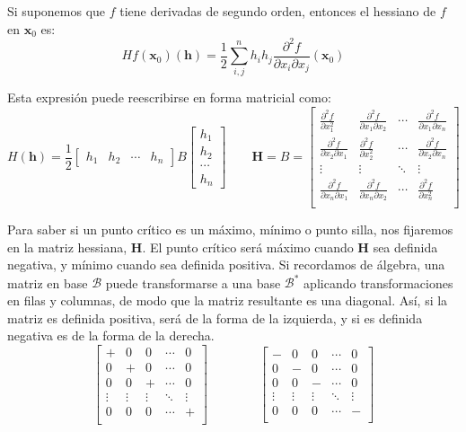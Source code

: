 \documentclass[a4paper]{article}
\begin{document}
Si suponemos que $f$ tiene derivadas de segundo orden, entonces el hessiano de $f$ en $\textbf{x}_0$ es:
\[ Hf(\textbf{x}_0)(\textbf{h}) = \frac{1}{2} \sum^n_{i,j}{h_ih_j\frac{\partial^2 f}{\partial x_i \partial x_j}(\textbf{x}_0)}\]

Esta expresión puede reescribirse en forma matricial como:
\[ H(\textbf{h}) = \frac{1}{2} \left[\begin{matrix}
h_1&h_2&\cdots &h_n
\end{matrix}\right] 
B
\left[\begin{matrix}
h_1\\h_2\\\cdots\\ h_n
\end{matrix}\right] \qquad \textbf{H} = B = \left[\begin{matrix}
\frac{\partial^2 f}{\partial x_1^2} & \frac{\partial^2 f}{\partial x_1 \partial x_2} &\cdots& \frac{\partial^2 f}{\partial x_1 \partial x_n} \\
\frac{\partial^2 f}{\partial x_2\partial x_1} & \frac{\partial^2 f}{ \partial x_2^2} &\cdots& \frac{\partial^2 f}{\partial x_2 \partial x_n} \\
\vdots & \vdots &\ddots& \vdots \\
\frac{\partial^2 f}{\partial x_n \partial x_1} & \frac{\partial^2 f}{\partial x_n \partial x_2} &\cdots& \frac{\partial^2 f}{ \partial x_n^2} \\
\end{matrix}\right] \]

Para saber si un punto crítico es un máximo, mínimo o punto silla, nos fijaremos en la matriz hessiana, \textbf{H}. El punto crítico será máximo cuando $\textbf{H}$ sea definida negativa, y mínimo cuando sea definida positiva. Si recordamos de álgebra, una matriz en base $\mathcal{B}$ puede transformarse a una base $\mathcal{B}^*$ aplicando transformaciones en filas y columnas, de modo que la matriz resultante es una diagonal. Así, si la matriz es definida positiva, será de la forma de la izquierda, y si es definida negativa es de la forma de la derecha.
\[\left[\begin{matrix}
+ & 0 & 0 & \cdots & 0\\
0 & + & 0 & \cdots & 0\\
0 & 0 & + & \cdots & 0\\
\vdots & \vdots & \vdots & \ddots & \vdots\\
0 & 0 & 0 & \cdots & +\\

\end{matrix}\right] \qquad\qquad
\left[\begin{matrix}
- & 0 & 0 & \cdots & 0\\
0 & - & 0 & \cdots & 0\\
0 & 0 & - & \cdots & 0\\
\vdots & \vdots & \vdots & \ddots & \vdots\\
0 & 0 & 0 & \cdots & -\\
\end{matrix}\right]
\]
\end{document}
